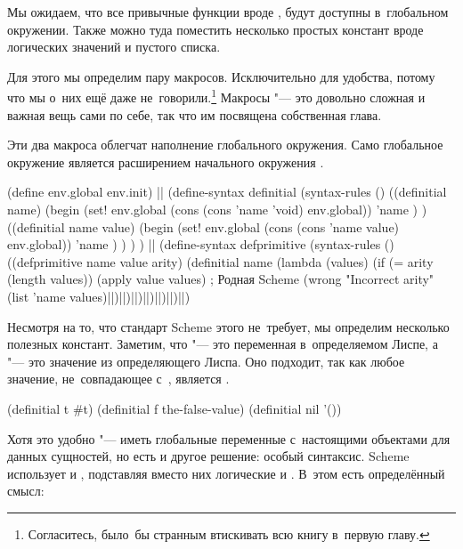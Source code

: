Мы ожидаем, что все привычные функции вроде ,  {\itp} будут
доступны в~глобальном окружении. Также можно туда поместить несколько простых
констант вроде логических значений и пустого списка.

Для этого мы определим пару макросов. Исключительно для удобства, потому что мы
о~них ещё даже не~говорили.\footnote*{Согласитесь, было~бы странным втискивать
всю книгу в~первую главу.} Макросы "--- это довольно сложная и важная вещь сами
по себе, так что им посвящена собственная глава. 

Эти два макроса облегчат наполнение глобального окружения. Само глобальное
окружение является расширением начального окружения .


\begin{code:lisp}
(define env.global env.init)
||
(define-syntax definitial
  (syntax-rules ()
    ((definitial name)
     (begin (set! env.global (cons (cons 'name 'void) env.global))
            'name ) )
    ((definitial name value)
     (begin (set! env.global (cons (cons 'name value) env.global))
            'name ) ) ) )
||
(define-syntax defprimitive
  (syntax-rules ()
    ((defprimitive name value arity)
     (definitial name
        (lambda (values)
          (if (= arity (length values))
              (apply value values)      ; Родная  Scheme
              (wrong "Incorrect arity" (list 'name values)|\:|)|\:|)|\:|)|\:|)|\:|)|\:|)|\:|)
\end{code:lisp}

Несмотря на то, что стандарт Scheme этого не~требует, мы определим несколько
полезных констант. Заметим, что  "--- это переменная в~определяемом Лиспе,
а  "--- это значение из определяющего Лиспа. Оно подходит, так как любое
значение, не~совпадающее с~, является .

\begin{code:lisp}
(definitial t #t)
(definitial f the-false-value)
(definitial nil '())
\end{code:lisp}


Хотя это удобно "--- иметь глобальные переменные с~настоящими объектами для
данных сущностей, но есть и другое решение: особый синтаксис. Scheme использует
 и , подставляя вместо них логические  и
. В~этом есть определённый смысл:

